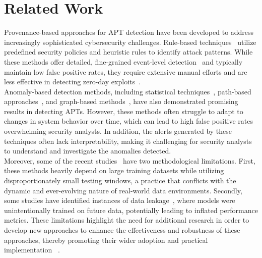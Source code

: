 \section{\label{sec:related}Related Work}

Provenance-based approaches for APT detection have been developed to address increasingly sophisticated cybersecurity challenges. 
Rule-based techniques~\cite{milajerdi2019holmes,yu2019needle} utilize predefined security policies and heuristic rules to identify attack patterns. 
While these methods offer detailed, fine-grained event-level detection~\cite{inam2023sok} and typically maintain low false positive rates, they require extensive manual efforts and are less effective in detecting zero-day exploits~\cite{hossain2020combating}. \\
\indent Anomaly-based detection methods, including statistical techniques~\cite{hossain2017sleuth,hassan2019nodoze,wang2020you,kurniawan2022krystal,dong2023distdet,Li_2024}, path-based approaches~\cite{du2017deeplog,zhang2019robust,guo2021logbert,alsaheel2021atlas}, and graph-based methods~\cite{han2020unicorn,wang2022threatrace,zengy2022shadewatcher,jia2023magic,yang2023prographer}, have also demonstrated promising results in detecting APTs. 
However, these methods often struggle to adapt to changes in system behavior over time, which can lead to high false positive rates overwhelming security analysts. 
In addition, the alerts generated by these techniques often lack interpretability, making it challenging for security analysts to understand and investigate the anomalies detected. \\
\indent Moreover, some of the recent studies~\cite{alsaheel2021atlas,wang2022threatrace,zengy2022shadewatcher,jia2023magic,han2020unicorn,Li_2024} have two methodological limitations. 
First, these methods heavily depend on large training datasets while utilizing disproportionately small testing windows, a practice that conflicts with the dynamic and ever-evolving nature of real-world data environments. 
Secondly, some studies have identified instances of data leakage~\cite{wang2022threatrace,jia2023magic}, where models were unintentionally trained on future data, potentially leading to inflated performance metrics. 
These limitations highlight the need for additional research in order to develop new approaches to enhance the effectiveness and robustness of these approaches, thereby promoting their wider adoption and practical implementation%
~\cite{van2019sok,dong2023we}. \\
